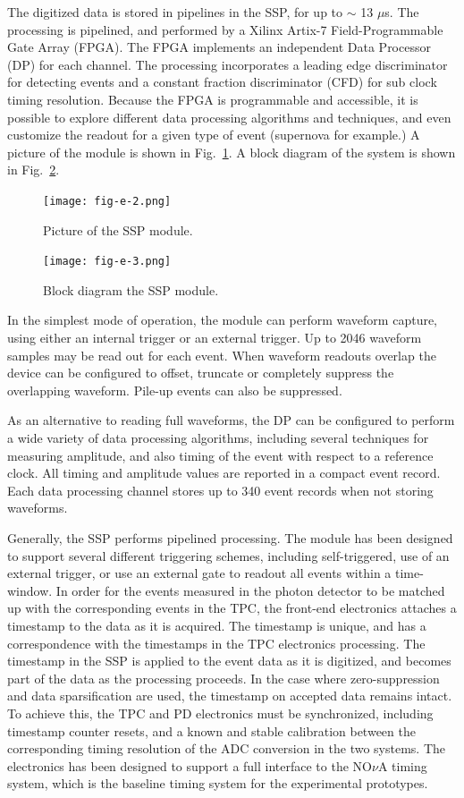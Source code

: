 The digitized data is stored in pipelines in the SSP, for up to $\sim$
13 $\mu$s.  The processing is pipelined, and performed by a Xilinx
Artix-7 Field-Programmable Gate Array (FPGA).  The FPGA implements an
independent Data Processor (DP) for each channel.  The processing
incorporates a leading edge discriminator for detecting events and a
constant fraction discriminator (CFD) for sub clock timing resolution.
Because the FPGA is programmable and accessible, it is possible to
explore different data processing algorithms and techniques, and even
customize the readout for a given type of event (supernova for
example.)  A picture of the module is shown in Fig.~\ref{fig:fig-e-2}.
A block diagram of the system is shown in Fig.~\ref{fig:fig-e-3}.
%
\begin{figure}[h]
  \centering
\texttt{[image: fig-e-2.png]}
\caption{Picture of the SSP module.}
\label{fig:fig-e-2}
\end{figure}
%
%
\begin{figure}[h]
  \centering
\texttt{[image: fig-e-3.png]}
\caption{Block diagram the SSP module.}
\label{fig:fig-e-3}
\end{figure}
%
In the simplest mode of operation, the module can perform waveform
capture, using either an internal trigger or an external trigger.  Up
to 2046 waveform samples may be read out for each event.  When
waveform readouts overlap the device can be configured to offset,
truncate or completely suppress the overlapping waveform.  Pile-up
events can also be suppressed.

As an alternative to reading full waveforms, the DP can be configured
to perform a wide variety of data processing algorithms, including
several techniques for measuring amplitude, and also timing of the
event with respect to a reference clock.  All timing and amplitude
values are reported in a compact event record.  Each data processing
channel stores up to 340 event records when not storing waveforms.

Generally, the SSP performs pipelined processing.  The module has been
designed to support several different triggering schemes, including
self-triggered, use of an external trigger, or use an external gate to
readout all events within a time-window.  In order for the events
measured in the photon detector to be matched up with the
corresponding events in the TPC, the front-end electronics attaches a
timestamp to the data as it is acquired.  The timestamp is unique, and
has a correspondence with the timestamps in the TPC electronics
processing.  The timestamp in the SSP is applied to the event data as
it is digitized, and becomes part of the data as the processing
proceeds.  In the case where zero-suppression and data sparsification
are used, the timestamp on accepted data remains intact.  To achieve
this, the TPC and PD electronics must be synchronized, including
timestamp counter resets, and a known and stable calibration between
the corresponding timing resolution of the ADC conversion in the two
systems.  The electronics has been designed to support a full
interface to the NO$\nu$A timing system, which is the baseline timing
system for the experimental prototypes.


